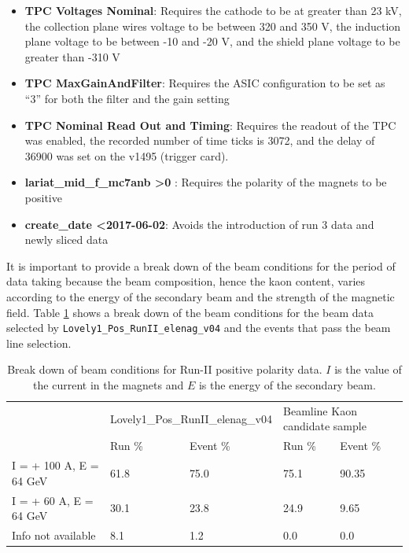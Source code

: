 \begin{itemize}
\item \textbf{TPC Voltages Nominal}: Requires the cathode to be at greater than 23 kV, the collection plane wires voltage to be between 320 and 350 V, the induction plane voltage to be between -10 and -20 V, and the shield plane voltage to be greater than -310 V

\item \textbf{TPC MaxGainAndFilter}: Requires the ASIC configuration to be set as ``3'' for both the filter and the gain setting

\item \textbf{TPC Nominal Read Out and Timing}: Requires the readout of the TPC was enabled, the recorded number of time ticks is 3072, and the delay of 36900 was set on the v1495 (trigger card).
\item \textbf{lariat\_mid\_f\_mc7anb \textgreater 0} : Requires the polarity of the magnets to be positive
\item \textbf{create\_date \textless  2017-06-02}: Avoids the introduction of run 3 data and newly sliced data
\end{itemize}


It is important to provide a break down of the beam conditions for the period of data taking because the beam composition, hence the kaon content, varies according to the energy of the secondary beam and the strength of the magnetic field. Table \ref{tab:beamConditions} shows a break down of the beam conditions for the beam data selected by  \verb!Lovely1_Pos_RunII_elenag_v04! and the events that pass the beam line  selection.


\begin{table}[]
\centering
\caption{Break down of beam conditions for Run-II positive polarity data. $I$ is the value of the current in the magnets and $E$ is the energy of the secondary beam.  }
\label{tab:beamConditions}
\begin{tabular}{l|l|l|l|l|}
\cline{2-5}
                                       & \multicolumn{2}{l|}{Lovely1\_Pos\_RunII\_elenag\_v04} & \multicolumn{2}{l|}{Beamline Kaon candidate sample} \\ \cline{2-5} 
                                       & Run \% & Event \% & Run \% & Event \% \\ \hline
\multicolumn{1}{|l|}{I = + 100 A, E = 64 GeV}   &   61.8          &        75.0   & 75.1  &  90.35   \\ \hline
\multicolumn{1}{|l|}{I =   + 60 A, E = 64 GeV}   &    30.1         &         23.8  & 24.9  &   9.65     \\ \hline
\multicolumn{1}{|l|}{Info not available}              &      8.1         &           1.2   &    0.0 &       0.0               \\ \hline
\end{tabular}
\end{table}



